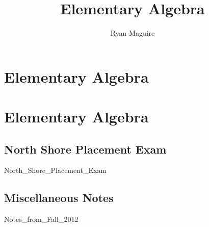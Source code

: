 \documentclass[crop=false,class=book,oneside]{standalone}
\begin{document}
    \ifx\ifmathcourses\undefined
        \title{Elementary Algebra}
        \author{Ryan Maguire}
        \date{\vspace{-5ex}}
        \maketitle
        \tableofcontents
        \chapter*{Elementary Algebra}
        \setcounter{chapter}{1}
    \else
        \chapter{Elementary Algebra}
    \fi
    \section{North Shore Placement Exam}
        {North_Shore_Placement_Exam}
    \section{Miscellaneous Notes}
        {Notes_from_Fall_2012}
    \ifx\ifmathcourses\undefined
        \clearpage
        \printglossary[type=\acronymtype]
        \clearpage
        \printglossary[style=long]
    \fi
\end{document}
